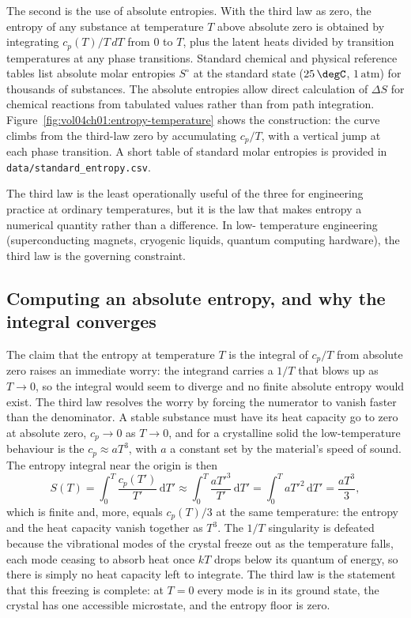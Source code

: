 The second is the use of absolute entropies. With the third law as
zero, the entropy of any substance at temperature $T$ above absolute
zero is obtained by integrating $c_p(T)/T \,dT$ from $0$ to $T$, plus
the latent heats divided by transition temperatures at any phase
transitions. Standard chemical and physical reference tables list
absolute molar entropies $S^\circ$ at the standard state ($25\,\degC$,
$1\,\text{atm}$) for thousands of substances. The absolute entropies
allow direct calculation of $\Delta S$ for chemical reactions from
tabulated values rather than from path integration.
Figure~\ref{fig:vol04ch01:entropy-temperature} shows the construction:
the curve climbs from the third-law zero by accumulating $c_p/T$, with
a vertical jump at each phase transition. A short table of standard
molar entropies is provided in \texttt{data/standard\_entropy.csv}.



The third law is the least operationally useful of the three for
engineering practice at ordinary temperatures, but it is the law that
makes entropy a numerical quantity rather than a difference. In low-
temperature engineering (superconducting magnets, cryogenic liquids,
quantum computing hardware), the third law is the governing
constraint.

\subsection{Computing an absolute entropy, and why the integral converges}

The claim that the entropy at temperature $T$ is the integral of $c_p/T$ from
absolute zero raises an immediate worry: the integrand carries a $1/T$ that blows
up as $T \to 0$, so the integral would seem to diverge and no finite absolute
entropy would exist. The third law resolves the worry by forcing the numerator to
vanish faster than the denominator. A stable substance must have its heat capacity
go to zero at absolute zero, $c_p \to 0$ as $T \to 0$, and for a crystalline solid
the low-temperature behaviour is the  $c_p \approx a T^3$, with
$a$ a constant set by the material's speed of sound. The entropy integral near the
origin is then
\[
S(T) = \int_0^T \frac{c_p(T')}{T'}\,\mathrm{d}T' \approx
\int_0^T \frac{a T'^3}{T'}\,\mathrm{d}T' = \int_0^T a T'^2\,\mathrm{d}T'
= \frac{a T^3}{3},
\]
which is finite and, more, equals $c_p(T)/3$ at the same temperature: the entropy
and the heat capacity vanish together as $T^3$. The $1/T$ singularity is defeated
because the vibrational modes of the crystal freeze out as the temperature falls,
each mode ceasing to absorb heat once $kT$ drops below its quantum of energy, so
there is simply no heat capacity left to integrate. The third law is the statement
that this freezing is complete: at $T = 0$ every mode is in its ground state, the
crystal has one accessible microstate, and the entropy floor is zero.

